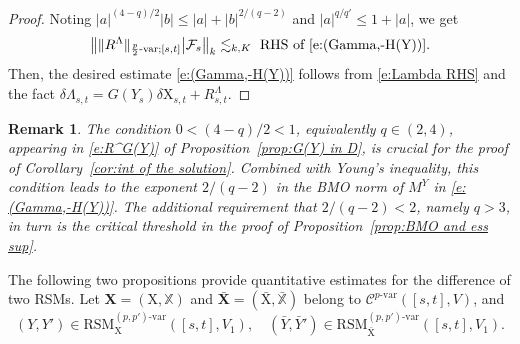 \documentclass[11pt,reqno]{amsart}
\newtheorem{remark}[lemma]{Remark}
\numberwithin{equation}{section}
\begin{document}
\begin{proof}
Noting $|a|^{(4-q)/2}|b| \le |a| + |b|^{2/(q-2)}$ and $|a|^{q/q'} \le 1 + |a|$, we get 
\begin{equation}\label{e:Lambda RHS}
\big\| \|R^{\Lambda}\|_{\frac{p}{2}\text{-var};[s,t]} \big| \mathcal F_{s} \big\|_{k} \lesssim_{k,K} \text{ RHS of \eqref{e:(Gamma,-H(Y))}}.
\end{equation}
Then, the desired estimate \eqref{e:(Gamma,-H(Y))} follows from  \eqref{e:Lambda RHS} and the fact $\delta \Lambda_{s,t} = G(Y_{s})\delta \mathrm X_{s,t} + R^{\Lambda}_{s,t}$. 
\end{proof}



\begin{remark}\label{rem:on the exponent}
The condition $0<(4-q)/2<1$, equivalently $q\in(2,4)$, appearing in \eqref{e:R^G(Y)} of Proposition~\ref{prop:G(Y) in D}, is crucial for the proof of Corollary~\ref{cor:int of the solution}. Combined with Young's inequality, this condition leads to the exponent $2/(q-2)$ in the \emph{BMO} norm of $M^{Y}$ in \eqref{e:(Gamma,-H(Y))}. The additional requirement that $2/(q-2) < 2$, namely $q>3$, in turn is the critical threshold in the proof of Proposition~\ref{prop:BMO and ess sup}. 
\end{remark}

The following two propositions provide quantitative estimates for the difference of two RSMs. Let $\mathbf X = (\mathrm X, \mathbb X)$ and $\bar{\mathbf X} = (\bar{\mathrm X},\bar{\mathbb X})$ belong to $\mathscr C^{p\text{-}\mathrm{var}}([s,t],V)$, and 
\begin{equation}\label{e:Y in RSM}
(Y,Y') \in \mathrm{RSM}^{(p,p')\text{-}\mathrm{var}}_{\mathrm X}([s,t],V_1),\quad (\bar Y,\bar Y') \in \mathrm{RSM}^{(p,p')\text{-}\mathrm{var}}_{\bar{\mathrm X}}([s,t],V_1).
\end{equation}
\end{document}

